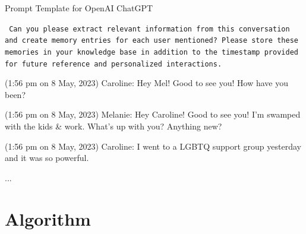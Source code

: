 \begin{EqBox}[!htbp]{Prompt Template for OpenAI ChatGPT}
\vspace{1mm}
{\tt \footnotesize  
Can you please extract relevant information from this conversation and create memory entries for each user mentioned? Please store these memories in your knowledge base in addition to the timestamp provided for future reference and personalized interactions.
\vspace{0.5cm}

(1:56 pm on 8 May, 2023) Caroline: Hey Mel! Good to see you! How have you been?

(1:56 pm on 8 May, 2023) Melanie: Hey Caroline! Good to see you! I'm swamped with the kids \& work. What's up with you? Anything new?

(1:56 pm on 8 May, 2023) Caroline: I went to a LGBTQ support group yesterday and it was so powerful.

...
}
\end{EqBox}




\clearpage

\section{Algorithm}
\label{appendix:algorithm}

